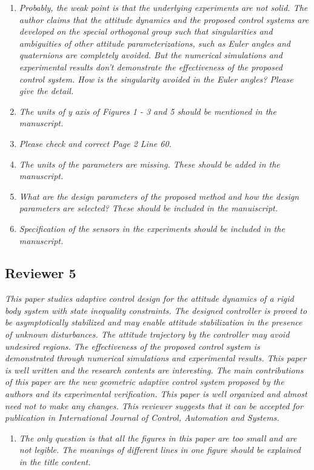 \documentclass[11pt]{article}
\begin{document}
\begin{enumerate}
\item \textit{Probably, the weak point is that the underlying experiments are not solid. The author claims that the attitude dynamics and the proposed control systems are developed on the special orthogonal group such that singularities and ambiguities of other attitude parameterizations, such as Euler angles and quaternions are completely avoided.  But the numerical simulations and experimental results don't demonstrate the effectiveness of the proposed control system. How is the singularity avoided in the Euler angles? Please give the detail.}
\item \textit{The units of y axis of Figures 1 - 3 and 5 should be mentioned in the manuscript.}
\item \textit{Please check and correct Page 2 Line 60.}
\item \textit{The units of the parameters are missing. These should be added in the manuscript.}
\item \textit{What are the design parameters of the proposed method and how the design parameters are selected? These should be included in the manuiscript.}
\item \textit{Specification of the sensors in the experiments should be included in the manuscript.}
\end{enumerate}

\subsection*{Reviewer 5}
\textit{This paper studies adaptive control design for the attitude dynamics of a rigid body system with state inequality constraints. The designed controller is proved to be asymptotically stabilized and may enable attitude stabilization in the presence of unknown disturbances. The attitude trajectory by the controller may avoid undesired regions. The effectiveness of the proposed control system is demonstrated through numerical simulations and experimental results. This paper is well written and the research contents are interesting. The main contributions of this paper are the new geometric adaptive control system proposed by the authors and its experimental verification. This paper is well organized and almost need not to make any changes. This reviewer suggests that it can be accepted for publication in International Journal of Control, Automation and Systems.}

\begin{enumerate}
\item \textit{The only question is that all the figures in this paper are too small and are not legible. The meanings of different lines in one figure should be explained in the title content.}
\end{enumerate}



\end{document}
